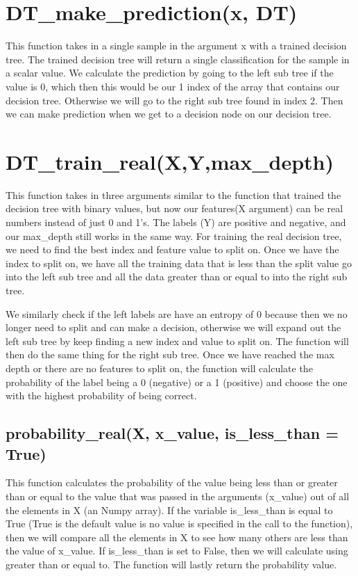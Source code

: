 \documentclass{article}
\begin{document}
\section{DT\_make\_prediction(x, DT)}
This function takes in a single sample in the argument x with a trained decision tree. The trained decision tree will return a single classification for the sample in a scalar value. We calculate the prediction by going to the left sub tree if the value is 0, which then this would be our 1 index of the array that contains our decision tree. Otherwise we will go to the right sub tree found in index 2. Then we can make prediction when we get to a decision node on our decision tree.

\section{DT\_train\_real(X,Y,max\_depth)}
This function takes in three arguments similar to the function that trained the decision tree with binary values, but now our features(X argument) can be real numbers instead of just 0 and 1's. The labels (Y) are positive and negative, and our max\_depth still works in the same way. For training the real decision tree, we need to find the best index and feature value to split on. Once we have the index to split on, we have all the training data that is less than the split value go into the left sub tree and all the data greater than or equal to into the right sub tree. 
\par We similarly check if the left labels are have an entropy of 0 because then we no longer need to split and can make a decision, otherwise we will expand out the left sub tree by keep finding a new index and value to split on. The function will then do the same thing for the right sub tree. Once we have reached the max depth or there are no features to split on, the function will calculate the probability of the label being a 0 (negative) or a 1 (positive) and choose the one with the highest probability of being correct.

\subsection{probability\_real(X, x\_value, is\_less\_than = True)}
This function calculates the probability of the value being less than or greater than or equal to the value that was passed in the arguments (x\_value) out of all the elements in X (an Numpy array). If the variable is\_less\_than is equal to True (True is the default value is no value is specified in the call to the function), then we will compare all the elements in X to see how many others are less than the value of x\_value. If is\_less\_than is set to False, then we will calculate using greater than or equal to. The function will lastly return the probability value.
\end{document}
